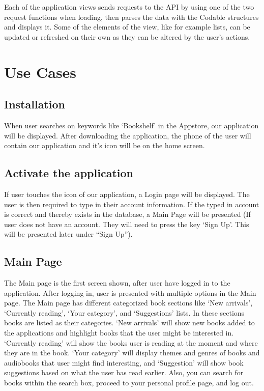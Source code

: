 \documentclass[conference]{IEEEtran}
\begin{document}
Each of the application views sends requests to the API by using one of the two request functions when loading, then parses the data with the Codable structures and displays it. Some of the elements of the view, like for example lists, can be updated or refreshed on their own as they can be altered by the user's actions.

\section{Use Cases}

\subsection{Installation}
When user searches on keywords like ‘Bookshelf’ in the Appstore, our application will be displayed. After downloading the application, the phone of the user will contain our application and it’s icon will be on the home screen.
\subsection{Activate the application}
If user touches the icon of our application, a Login page will be displayed. The user is then required to type in their account information. If the typed in account is correct and thereby exists in the database, a Main Page will be presented (If user does not have an account. They will need to press the key ‘Sign Up’. This will be presented later under “Sign Up”).
\subsection{Main Page}
The Main page is the first screen shown, after user have logged in to the application. After logging in, user is presented with multiple options in the Main page. The Main page has different categorized book sections like ‘New arrivals’, ‘Currently reading’, ‘Your category’, and ‘Suggestions’ lists. In these sections books are listed as their categories. ‘New arrivals’ will show new books added to the applications and highlight books that the user might be interested in. ‘Currently reading’ will show the books user is reading at the moment and where they are in the book. ‘Your category’ will display themes and genres of books and audiobooks that user might find interesting, and ‘Suggestion’ will show book suggestions based on what the user has read earlier. Also, you can search for books within the search box, proceed to your personal profile page, and log out.
\end{document}
